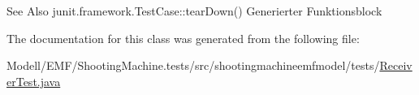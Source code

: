 \begin{DoxySeeAlso}{See Also}
junit.\-framework.\-Test\-Case\-::tear\-Down() Generierter Funktionsblock 
\end{DoxySeeAlso}


The documentation for this class was generated from the following file\-:\begin{DoxyCompactItemize}
\item 
Modell/\-E\-M\-F/\-Shooting\-Machine.\-tests/src/shootingmachineemfmodel/tests/\hyperlink{_receiver_test_8java}{Receiver\-Test.\-java}\end{DoxyCompactItemize}
